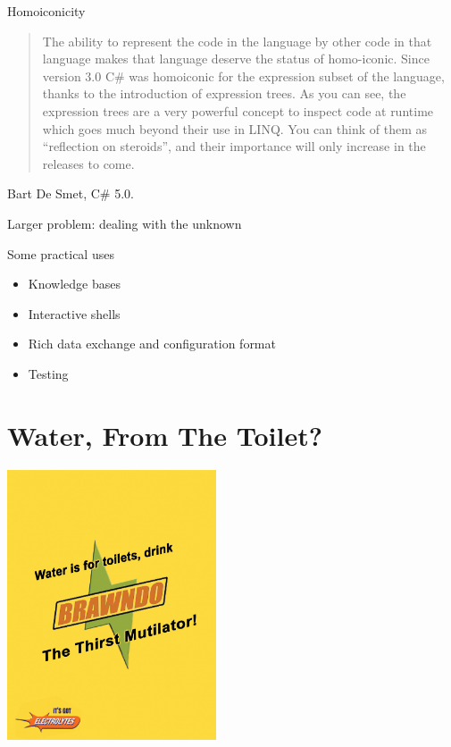 \documentclass[presentation]{beamer}
\begin{document}
\begin{frame}[label=sec-1-3]{Homoiconicity}
\begin{quote}
The ability to represent the code in the language by other code in
that language makes that language deserve the status of
homo-iconic.  Since version 3.0 C\# was homoiconic for the
expression subset of the language, thanks to the introduction of
expression trees.  As you can see, the expression trees are a very
powerful concept to inspect code at runtime which goes much beyond
their use in LINQ.  You can think of them as ``reflection on
steroids'', and their importance will only increase in the
releases to come.
\end{quote}
Bart De Smet, C\# 5.0.
\end{frame}

\begin{frame}[label=sec-1-4]{Larger problem: dealing with the unknown}
\end{frame}

\begin{frame}[label=sec-1-5]{Some practical uses}
\begin{itemize}
\item Knowledge bases
\item Interactive shells
\item Rich data exchange and configuration format
\item Testing
\end{itemize}
\end{frame}

\section{Water, From The Toilet?}
\label{sec-2}
\includegraphics[height=8cm]{./images/water-from-toilet.jpg}
\end{document}
